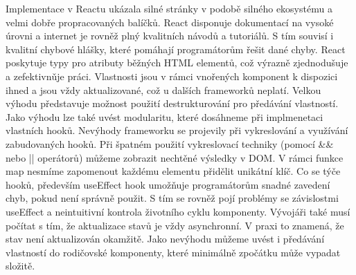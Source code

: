 \begin{zvyraznenyodstavec}
Implementace v Reactu ukázala silné stránky v podobě silného ekosystému a velmi dobře propracovaných balíčků. 
React disponuje dokumentací na vysoké úrovni a internet je rovněž plný kvalitních návodů a tutoriálů. 
S tím souvisí i kvalitní chybové hlášky, které pomáhají programátorům řešit dané chyby. 
React poskytuje typy pro atributy běžných HTML elementů, což výrazně zjednodušuje a zefektivnǔje práci. 
Vlastnosti jsou v rámci vnořených komponent k dispozici ihned a jsou vždy aktualizované, což u dalších frameworků neplatí. 
Velkou výhodu představuje možnost použití destrukturování pro předávání vlastností. 
Jako výhodu lze také uvést modularitu, které dosáhneme při implmenetaci vlastních hooků. 
Nevýhody frameworku se projevily při vykreslování a využívání zabudovaných hooků. 
Při špatném použití vykreslovací techniky (pomocí \&\& nebo || operátorů) můžeme zobrazit nechtěné výsledky v DOM. 
V rámci funkce map nesmíme zapomenout každému elementu přidělit unikátní klíč. 
Co se týče hooků, především useEffect hook umožňuje programátorům snadné zavedení chyb, pokud není správně použit. 
S tím se rovněž pojí problémy se závislostmi useEffect a neintuitivní kontrola životního cyklu komponenty. 
Vývojáři také musí počítat s tím, že aktualizace stavů je vždy asynchronní. V praxi to znamená, že stav není aktualizován okamžitě. 
Jako nevýhodu můžeme uvést i předávání vlastností do rodičovské komponenty, které minimálně zpočátku může vypadat složitě.



\end{zvyraznenyodstavec}
